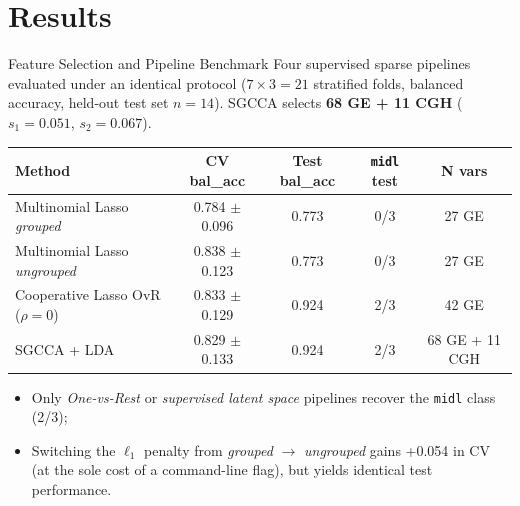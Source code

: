 \documentclass[aspectratio=169, 10pt]{beamer}
\begin{document}
\section{Results}

\begin{frame}{Feature Selection and Pipeline Benchmark}
  Four supervised sparse pipelines evaluated under an identical protocol ($7 \times 3 = 21$ stratified folds, balanced accuracy, held-out test set $n = 14$). SGCCA selects \textbf{68 GE + 11 CGH} ($s_1 = 0.051$, $s_2 = 0.067$).

  \medskip
  \begin{center}
    \small
    \begin{tabular}{lcccc}
      \toprule
      \textbf{Method}                      & \textbf{CV bal\_acc} & \textbf{Test bal\_acc} & \texttt{\textbf{midl}} \textbf{test} & \textbf{N vars} \\
      \midrule
      Multinomial Lasso \textit{grouped}   & 0.784 $\pm$ 0.096    & 0.773                  & 0/3                                  & 27 GE           \\
      Multinomial Lasso \textit{ungrouped} & 0.838 $\pm$ 0.123    & 0.773                  & 0/3                                  & 27 GE           \\
      \rowcolor{boxgreen}
      Cooperative Lasso OvR ($\rho = 0$)   & 0.833 $\pm$ 0.129    & 0.924                  & 2/3                                  & 42 GE           \\
      \rowcolor{boxgreen}
      SGCCA + LDA                          & 0.829 $\pm$ 0.133    & 0.924                  & 2/3                                  & 68 GE + 11 CGH  \\
      \bottomrule
    \end{tabular}
  \end{center}

  \bigskip
  \begin{itemize}
    \item Only \textit{One-vs-Rest} or \textit{supervised latent space} pipelines recover the \texttt{midl} class (2/3);
    \item Switching the $\ell_1$ penalty from \textit{grouped} $\to$ \textit{ungrouped} gains +0.054 in CV (at the sole cost of a command-line flag), but yields identical test performance.
  \end{itemize}
\end{frame}
\end{document}
